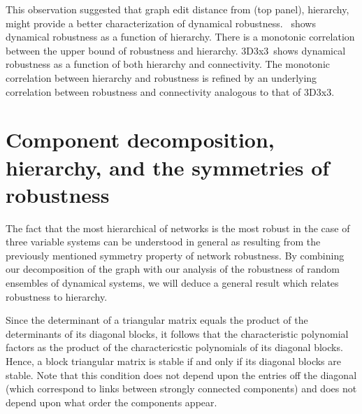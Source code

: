 This observation suggested that graph edit distance from  (top panel), hierarchy, might provide a better characterization of dynamical robustness. $\,$ shows dynamical robustness as a function of hierarchy. There is a monotonic correlation between the upper bound of robustness and hierarchy. 3D3x3$\,$ shows dynamical robustness as a function of both hierarchy and connectivity. The monotonic correlation between hierarchy and robustness is refined by an underlying correlation between robustness and connectivity analogous to that of 3D3x3.


\section{Component decomposition, hierarchy, and the symmetries of robustness}

The fact that the most hierarchical of networks is the most robust in the case of three variable systems can be understood in general as resulting from the previously mentioned symmetry property of network robustness.  By combining our decomposition of the graph with our analysis of the robustness of random ensembles of dynamical systems, we will deduce a general result which relates robustness to hierarchy.

Since the determinant of a triangular matrix equals the product of the determinants of its diagonal blocks, it follows that the characteristic polynomial factors as the product of the charactericstic polynomials of its diagonal blocks.  Hence, a block triangular matrix is stable if and only if its diagonal blocks are stable.  Note that this condition does not depend upon the entries off the diagonal (which correspond to links between strongly connected components) and does not depend upon what order the components appear.

